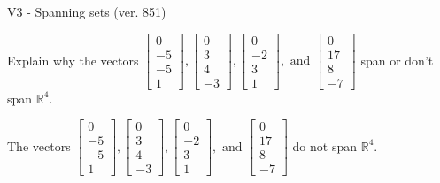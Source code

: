 \begin{exercise}
  \begin{exerciseTitle}V3 - Spanning sets (ver. 851)\end{exerciseTitle}
  \begin{exerciseStatement}
    Explain why the vectors \(\left[\begin{array}{r}
0 \\
-5 \\
-5 \\
1
\end{array}\right] , \left[\begin{array}{r}
0 \\
3 \\
4 \\
-3
\end{array}\right] , \left[\begin{array}{r}
0 \\
-2 \\
3 \\
1
\end{array}\right] , \text{ and } \left[\begin{array}{r}
0 \\
17 \\
8 \\
-7
\end{array}\right]\) span or don't span \(\mathbb{R}^4\). 
	


  \end{exerciseStatement}
  \begin{exerciseAnswer}
   The vectors \(\left[\begin{array}{r}
0 \\
-5 \\
-5 \\
1
\end{array}\right] , \left[\begin{array}{r}
0 \\
3 \\
4 \\
-3
\end{array}\right] , \left[\begin{array}{r}
0 \\
-2 \\
3 \\
1
\end{array}\right] , \text{ and } \left[\begin{array}{r}
0 \\
17 \\
8 \\
-7
\end{array}\right]\) 
  	 do not  
	span \(\mathbb{R}^4\).
  


  \end{exerciseAnswer}
\end{exercise}
